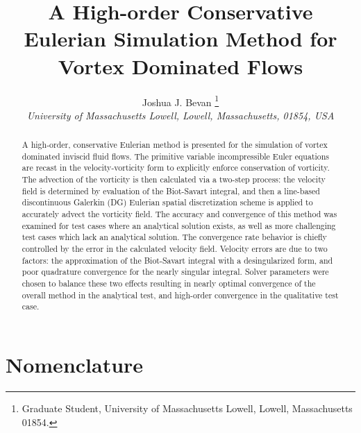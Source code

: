 \documentclass[]{aiaa-tc}%
\title{A High-order Conservative Eulerian Simulation Method for Vortex Dominated Flows}
\author{
 Joshua J. Bevan%
    \thanks{Graduate Student, University of Massachusetts Lowell, Lowell, Massachusetts 01854.}\\
  {\normalsize\itshape
   University of Massachusetts Lowell, Lowell, Massachusetts, 01854, USA}\\
 }
\begin{document}
\maketitle

\begin{abstract}
A high-order, conservative Eulerian method is presented for the simulation of vortex dominated inviscid fluid flows. The primitive variable incompressible Euler equations are recast in the velocity-vorticity form to explicitly enforce conservation of vorticity. The advection of the vorticity is then calculated via a two-step process: the velocity field is determined by evaluation of the Biot-Savart integral, and then a line-based discontinuous Galerkin (DG) Eulerian spatial discretization scheme is applied to accurately advect the vorticity field. The accuracy and convergence of this method was examined for test cases where an analytical solution exists, as well as more challenging test cases which lack an analytical solution. The convergence rate behavior is chiefly controlled by the error in the calculated velocity field. Velocity errors are due to two factors: the approximation of the Biot-Savart integral with a desingularized form, and poor quadrature convergence for the nearly singular integral. Solver parameters were chosen to balance these two effects resulting in nearly optimal convergence of the overall method in the analytical test, and high-order convergence in the qualitative test case.
\end{abstract}

\section*{Nomenclature}

\end{document}
